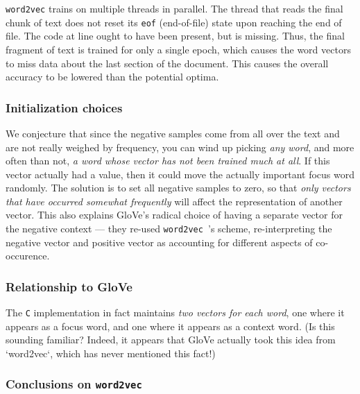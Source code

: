 \documentclass[11pt]{book}
\newcommand*\circled[1]{\tikz[baseline=(char.base)]{
            \node[shape=circle,fill=pairedOneLightBlue,inner sep=1pt] (char) {#1};}}
\newcommand{\wtov}{\texttt{word2vec }}
\begin{document}
\texttt{word2vec} trains on multiple threads in parallel. The thread that reads
the final chunk of text does not reset its \texttt{eof} (end-of-file) state
upon reaching the end of file. The code at line \circled{5} ought to have been present,
but is missing. Thus, the final fragment of text is trained for only a single
epoch, which causes the word vectors to miss data about the last section of the document.
This causes the overall accuracy  to be lowered than the potential optima.

\subsubsection{Initialization choices}

We conjecture that since the negative samples come from all over the text and
are not really weighed by frequency, you can wind up picking \emph{any word},
and more often than not, \emph{a word whose vector has not been trained much at
all}.  If this vector actually had a value, then it could move the actually
important focus word randomly. The solution is to set all negative samples to
zero, so that \emph{only vectors that have occurred somewhat frequently} will
affect the representation of another vector. This also explains GloVe's radical
choice of having a separate vector for the negative context --- they re-used
\wtov's  scheme, re-interpreting the negative vector and positive vector as
accounting for different aspects of co-occurence.


\subsubsection{Relationship to GloVe}

The \texttt{C} implementation in fact maintains \emph{two vectors for each word}, one where
it appears as a focus word, and one where it appears as a context word.
(Is this sounding familiar? Indeed, it appears that GloVe actually took this
idea from `word2vec`, which has never mentioned this fact!) 


\subsubsection{Conclusions on \texttt{word2vec}}
\end{document}
